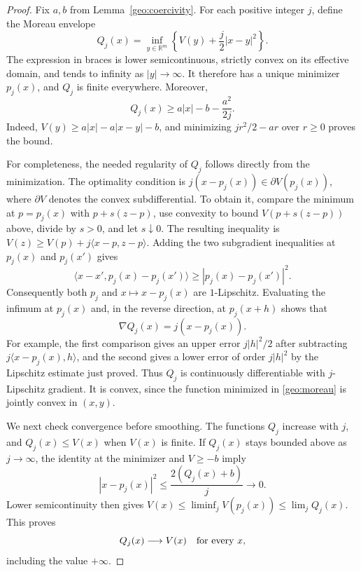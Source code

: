 \documentclass[11pt]{article}
\newcommand{\R}{\mathbb R}
\theoremstyle{definition}
\theoremstyle{remark}
\numberwithin{equation}{section}
\begin{document}
\begin{proof}
Fix $a,b$ from Lemma~\ref{geo:coercivity}.  For each positive integer $j$,
define the Moreau envelope \cite[Section~7]{Moreau1965}
\begin{equation}\label{geo:moreau}
  Q_j(x)=\inf_{y\in\R^m}\left\{V(y)+\frac j2|x-y|^2\right\}.
\end{equation}
The expression in braces is lower semicontinuous, strictly convex on its
effective domain, and tends to infinity as $|y|\to\infty$.  It therefore
has a unique minimizer $p_j(x)$, and $Q_j$ is finite everywhere.  Moreover,
\begin{equation}\label{geo:envelope-lower}
  Q_j(x)\geq a|x|-b-\frac{a^2}{2j}.
\end{equation}
Indeed, $V(y)\geq a|x|-a|x-y|-b$, and minimizing
$jr^2/2-ar$ over $r\geq0$ proves the bound.

For completeness, the needed regularity of $Q_j$ follows directly from
the minimization.  The optimality condition is
$j(x-p_j(x))\in\partial V(p_j(x))$, where $\partial V$ denotes the convex
subdifferential.  To obtain it, compare the minimum at $p=p_j(x)$ with
$p+s(z-p)$, use convexity to bound $V(p+s(z-p))$ above, divide by $s>0$,
and let $s\downarrow0$.  The resulting inequality is
$V(z)\geq V(p)+j\langle x-p,z-p\rangle$.
Adding the two subgradient inequalities at $p_j(x)$ and
$p_j(x')$ gives
\[
  \langle x-x',p_j(x)-p_j(x')\rangle
  \geq |p_j(x)-p_j(x')|^2.
\]
Consequently both $p_j$ and $x\mapsto x-p_j(x)$ are $1$-Lipschitz.
Evaluating the infimum at $p_j(x)$ and, in the reverse direction, at
$p_j(x+h)$ shows that
\[
  \nabla Q_j(x)=j(x-p_j(x)).
\]
For example, the first comparison gives an upper error $j|h|^2/2$
after subtracting $j\langle x-p_j(x),h\rangle$, and the second gives
a lower error of order $j|h|^2$ by the Lipschitz estimate just proved.
Thus $Q_j$ is continuously differentiable with $j$-Lipschitz gradient.
It is convex, since the function minimized in \eqref{geo:moreau} is jointly
convex in $(x,y)$.

We next check convergence before smoothing.  The functions $Q_j$ increase
with $j$, and $Q_j(x)\leq V(x)$ when $V(x)$ is finite.  If $Q_j(x)$ stays
bounded above as $j\to\infty$, the identity at the minimizer and $V\geq-b$
imply
\[
  |x-p_j(x)|^2\leq\frac{2(Q_j(x)+b)}j\longrightarrow0.
\]
Lower semicontinuity then gives
$V(x)\leq\liminf_j V(p_j(x))\leq\lim_jQ_j(x)$.
This proves
\begin{equation}\label{geo:envelope-limit}
  Q_j(x)\longrightarrow V(x)\quad\hbox{for every }x,
\end{equation}
including the value $+\infty$.


\end{proof}
\end{document}
